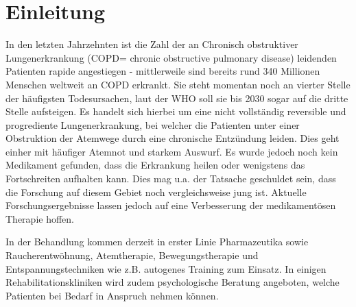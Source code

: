 \chapter{Einleitung}
\label{einleitung}
\ifpdf
    \graphicspath{{1_introduction/figures/PNG/}{1_einleitung/figures/PDF/}{1_einleitung/figures/}}
\else
    \graphicspath{{1_einleitung/figures/EPS/}{1_einleitung/figures/}}
\fi

In den letzten Jahrzehnten ist die Zahl der an Chronisch obstruktiver Lungenerkrankung (COPD= chronic obstructive pulmonary disease) leidenden Patienten rapide angestiegen - mittlerweile sind bereits rund 340 Millionen Menschen weltweit an COPD erkrankt. Sie steht momentan noch an vierter Stelle der häufigsten Todesursachen, laut der WHO soll sie bis 2030 sogar auf die dritte Stelle aufsteigen. Es handelt sich hierbei um eine nicht vollständig reversible und progrediente Lungenerkrankung, bei welcher die Patienten unter einer Obstruktion der Atemwege durch eine chronische Entzündung leiden. Dies geht einher mit häufiger Atemnot und starkem Auswurf.
Es wurde jedoch noch kein Medikament gefunden, dass die Erkrankung heilen oder wenigstens das Fortschreiten aufhalten kann. Dies mag u.a. der Tatsache geschuldet sein, dass die Forschung auf diesem Gebiet noch vergleichsweise jung ist. Aktuelle Forschungsergebnisse lassen jedoch auf eine Verbesserung der medikamentösen Therapie hoffen.

In der Behandlung kommen derzeit in erster Linie Pharmazeutika sowie Raucherentwöhnung, Atemtherapie, Bewegungstherapie und Entspannungstechniken wie z.B. autogenes Training zum Einsatz. In einigen Rehabilitationskliniken wird zudem psychologische Beratung angeboten, welche Patienten bei Bedarf in Anspruch nehmen können.

